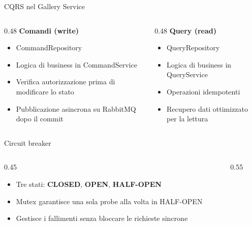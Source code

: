 \documentclass[10pt]{beamer}
\begin{document}
\begin{frame}{CQRS nel Gallery Service}
\begin{columns}[T]
\begin{column}{0.48\textwidth}
\textbf{Comandi (write)}
\begin{itemize}
    \item CommandRepository
    \item Logica di business in CommandService
    \item Verifica autorizzazione prima di modificare lo stato
    \item Pubblicazione asincrona su RabbitMQ dopo il commit
\end{itemize}
\end{column}

\begin{column}{0.48\textwidth}
\textbf{Query (read)}
\begin{itemize}
    \item QueryRepository
    \item Logica di business in QueryService
    \item Operazioni idempotenti
    \item Recupero dati ottimizzato per la lettura
\end{itemize}
\end{column}
\end{columns}
\end{frame}

\begin{frame}{Circuit breaker}
\begin{columns}[T]
\begin{column}{0.45\textwidth}
\centering
	\begin{itemize}    		
    		\item Tre stati: \textbf{CLOSED}, \textbf{OPEN}, \textbf{HALF-OPEN}
    		\item Mutex garantisce una sola probe alla volta in HALF-OPEN
    		\item Gestisce i fallimenti senza bloccare le richieste sincrone
     \end{itemize}
\end{column}     
\begin{column}{0.55\textwidth}
\centering
{}
\end{column}     
\end{columns}
\end{frame}
\end{document}
